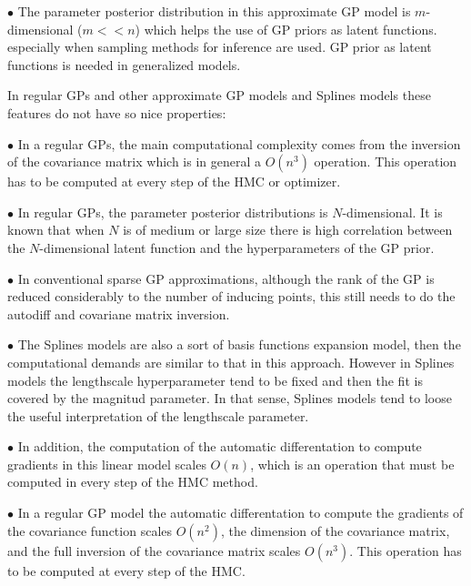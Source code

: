 \documentclass[]{interact}
\theoremstyle{plain}%
\theoremstyle{definition}
\theoremstyle{remark}
\begin{document}
\vspace{2mm}
$\bullet$ The parameter posterior distribution in this approximate GP model is $m$-dimensional ($m<<n$) which helps the use of GP priors as latent functions. especially when sampling methods for inference are used. GP prior as latent functions is needed in generalized models.

In regular GPs and other approximate GP models and Splines models these features do not have so nice properties:

\vspace{2mm}
$\bullet$ In a regular GPs, the main computational complexity comes from the inversion of the covariance matrix which is in general a $O(n^3)$ operation. This operation has to be computed at every step of the HMC or optimizer.

\vspace{2mm}
$\bullet$ In regular GPs, the parameter posterior distributions is $N$-dimensional. It is known that when $N$ is of medium or large size there is high correlation between the $N$-dimensional latent function and the hyperparameters of the GP prior.

\vspace{2mm}
$\bullet$ In conventional sparse GP approximations, although the rank of the GP is reduced considerably to the number of inducing points, this still needs to do the autodiff and covariane matrix inversion.

\vspace{2mm}
$\bullet$ The Splines models are also a sort of basis functions expansion model, then the computational demands are similar to that in this approach. However in Splines models the lengthscale hyperparameter tend to be fixed and then the fit is covered by the magnitud parameter. In that sense, Splines models tend to loose the useful interpretation of the lengthscale parameter.

\vspace{2mm}
$\bullet$ In addition, the computation of the automatic differentation to compute gradients in this linear model scales $O(n)$, which is an operation that must be computed in every step of the HMC method.

\vspace{2mm}
$\bullet$ In a regular GP model the automatic differentation to compute the gradients of the covariance function scales $O(n^2)$, the dimension of the covariance matrix, and the full inversion of the covariance matrix scales $O(n^3)$. This operation has to be computed at every step of the HMC.
\end{document}
